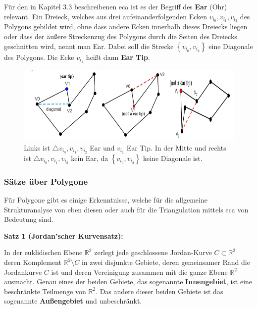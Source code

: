 Für den in Kapitel 3.3 beschreibenen \ac{eca} ist es der Begriff des \textbf{Ear} (Ohr) relevant. 
Ein Dreieck, welches aus drei aufeinanderfolgenden Ecken $v_{i_0}, v_{i_1}, v_{i_2}$ des Polygons gebildet wird, ohne dass andere Ecken innerhalb 
dieses Dreiecks liegen oder dass der äußere Streckenzug des Polygons durch die Seiten des Dreiecks geschnitten wird, nennt man Ear. Dabei soll die 
Strecke $\left\{v_{i_0}, v_{i_2}\right\}$ eine Diagonale des Polygons. Die Ecke $v_{i_1}$ heißt dann \textbf{Ear Tip}.\cite{meister}

\begin{figure}[h]
  \centering
  \includegraphics[width=1\textwidth]{bilder/eartips.PNG}
  \caption[Beispiele für Ear und Ear Tips in Polygonen]{\centering Links ist  $\triangle v_{i_0}, v_{i_1}, v_{i_2}$ Ear und $v_{i_1}$ Ear Tip. In der Mitte und rechts 
  ist $\triangle v_{i_0}, v_{i_1}, v_{i_2}$ kein Ear, da $\left\{v_{i_0}, v_{i_2}\right\}$ keine Diagonale ist. \cite{newAlg}}
  \label{fig:ear_eartip}
\end{figure}

\subsubsection{Sätze über Polygone}

Für Polygone gibt es einige Erkenntnisse, welche für die allgemeine Strukturanalyse von eben diesen oder auch für die Triangulation mittels 
\ac{eca} von Bedeutung sind. \break

\begin{flushleft}
  { \textbf{Satz 1 (Jordan'scher Kurvensatz):}

In der euklidischen Ebene $\mathbb{R}^2$ zerlegt jede geschlossene Jordan-Kurve $C \subset \mathbb{R}^2 $ deren Komplement $\mathbb{R}^2 \setminus C$ 
in zwei disjunkte Gebiete, deren gemeinsamer Rand die Jordankurve $C$ ist und deren Vereinigung zusammen mit die ganze Ebene $\mathbb{R}^2$ ausmacht.
\linebreak Genau eines der beiden Gebiete, das sogenannte \textbf{Innengebiet}, ist eine beschränkte Teilmenge von $\mathbb{R}^2$.
\linebreak Das andere dieser beiden Gebiete ist das sogenannte \textbf{Außengebiet} und unbeschränkt. \cite{jordan}
}
\end{flushleft}

